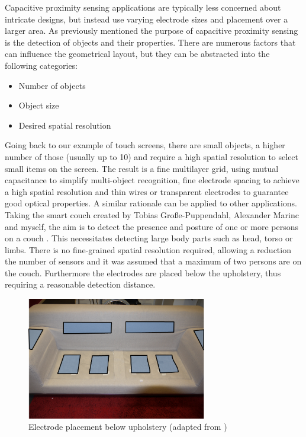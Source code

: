 Capacitive proximity sensing applications are typically less concerned about intricate designs, but instead use varying electrode sizes and placement over a larger area. As previously mentioned the purpose of capacitive proximity sensing is the detection of objects and their properties. There are numerous factors that can influence the geometrical layout, but they can be abstracted into the following categories:
\begin{itemize}
\item	Number of objects
\item	Object size
\item	Desired spatial resolution
\end{itemize}
Going back to our example of touch screens, there are small objects, a higher number of those (usually up to 10) and require a high spatial resolution to select small items on the screen. The result is a fine multilayer grid, using mutual capacitance to simplify multi-object recognition, fine electrode spacing to achieve a high spatial resolution and thin wires or transparent electrodes to guarantee good optical properties. A similar rationale can be applied to other applications. Taking the smart couch created by Tobias Große-Puppendahl, Alexander Marinc and myself, the aim is to detect the presence and posture of one or more persons on a couch \cite{Couch2011}. This necessitates detecting large body parts such as head, torso or limbs. There is no fine-grained spatial resolution required, allowing a reduction the number of sensors and it was assumed that a maximum of two persons are on the couch. Furthermore the electrodes are placed below the upholstery, thus requiring a reasonable detection distance. 

\begin{figure} [h]
\centering
\includegraphics[width=0.7\textwidth]{images/couch_electrodes.png} 
\caption{Electrode placement below upholstery (adapted from \cite{Couch2011})}
\label{fig:couch_electrodes}
\end{figure}

